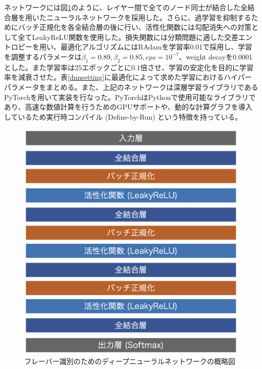 ネットワークには図\ref{dnnmodel}のように、レイヤー間で全てのノード同士が結合した全結合層を用いたニューラルネットワークを採用した。さらに、過学習を抑制するためにバッチ正規化を各全結合層の後に行い、活性化関数には勾配消失への対策として全てLeakyReLU関数を使用した。損失関数には分類問題に適した交差エントロピーを用い、最適化アルゴリズムにはRAdamを学習率0.01で採用し、学習を調整するパラメータは${\beta}_1 = 0.89, {\beta}_2 = 0.85, eps = 10^{-7}$、weight decayを0.0001とした。また学習率は25エポックごとに0.1倍させ、学習の安定化を目的に学習率を減衰させた。表\ref{dnnsetting}に最適化によって求めた学習におけるハイパーパラメータをまとめる。また、上記のネットワークは深層学習ライブラリであるPyTorchを用いて実装を行なった。PyTorchはPythonで使用可能なライブラリであり、高速な数値計算を行うためのGPUサポートや、動的な計算グラフを導入しているため実行時コンパイル (Define-by-Run) という特徴を持っている。
\begin{figure}[H]
	\begin{center}
 \includegraphics[keepaspectratio, scale=0.35]
 	{Figure/Flavortagging/dnn.png}
 		\caption{フレーバー識別のためのディープニューラルネットワークの概略図}
 		\label{dnnmodel}
	\end{center}
\end{figure}
